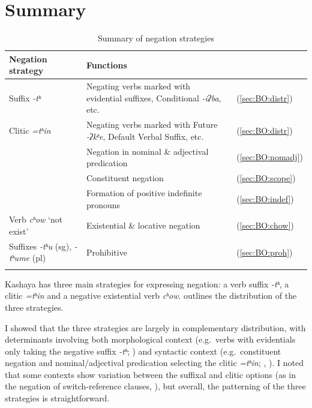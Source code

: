 \documentclass[output=paper,modfonts,nonflat,colorlinks,citecolor=brown]{langscibook}
\begin{document}
\section{Summary}
\largerpage[1.5]
\begin{table}[b]
\caption{Summary of negation strategies}
\label{tab:BO:last}
\begin{tabularx}{\textwidth}{lQl}
\lsptoprule
Negation strategy & Functions \\
\midrule
Suffix \textit{-tʰ} &  Negating verbs marked with evidential suffixes, Conditional \textit{-iʔba}, etc. & (\ref{sec:BO:distr})\\
\tablevspace
Clitic \textit{=tʰin} &  Negating verbs marked with Future \textit{-ʔkʰe}, Default Verbal Suffix, etc. & (\ref{sec:BO:distr})\\
		&  Negation in nominal \& adjectival predication & (\ref{sec:BO:nomadj})\\
		&  Constituent negation & (\ref{sec:BO:scope})  \\
    & Formation of positive indefinite pronouns & (\ref{sec:BO:indef})\\
\tablevspace
Verb \textit{cʰow} `not exist' &  Existential \& locative negation & (\ref{sec:BO:chow}) \\
\tablevspace
Suffixes \textit{-tʰu} (sg), \textit{-tʰume} (pl) & Prohibitive & (\ref{sec:BO:proh})\\
\lspbottomrule
\end{tabularx}
\end{table}

Kashaya has three main strategies for expressing negation: a verb suffix \textit{-tʰ}, a clitic \textit{=tʰin} and a negative existential verb \textit{cʰow}.  outlines the distribution of the three strategies.

I showed that the three strategies are largely in complementary distribution, with determinants involving both morphological context (e.g.\ verbs with evidentials only taking the negative suffix \textit{-tʰ}; ) and syntactic context (e.g.\ constituent negation and nominal/adjectival predication selecting the clitic \textit{=tʰin}; , ). I noted that some contexts show variation between the suffixal and clitic options (as in the negation of switch-reference clauses, ), but overall, the patterning of the three strategies is straightforward.
\end{document}
